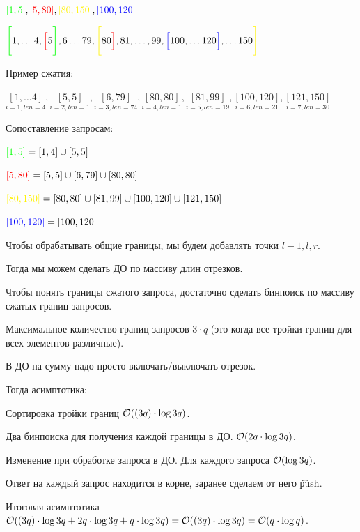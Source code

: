 $\green{[1, 5]}, \red{[5, 80]}, \yellow{[80, 150]}, \blue{[100, 120]}$

$\green{\Bigg[} 1, \ldots 4, \red{\Big[} 5 \green{\Bigg]}, 6 \ldots 79, \yellow{\Bigg[}80 \red{\Big]}, 81, \ldots, 99, \blue{\Big[}100, \ldots 120 \blue{\Big]}, \ldots 150 \yellow{\Bigg]}$
\down

Пример сжатия:

$\underset{i=1, len = 4}{[1, \ldots 4]}, \underset{i=2, len=1}{[5, 5]}, \underset{i=3, len=74}{[6, 79]}, \underset{i=4, len=1}{[80, 80]}, \underset{i=5, len=19}{[81, 99]}, \underset{i=6, len=21}{[100, 120]}, \underset{i=7, len=30}{[121, 150]}$
\down

Сопоставление запросам:

${\color{green}{[1, 5]}} = [1, 4] \cup [5, 5]$

${\color{red}{[5, 80]}} = [5, 5] \cup [6, 79] \cup [80, 80]$

$\yellow{[80, 150]} = [80, 80] \cup [81, 99] \cup [100, 120] \cup [121, 150]$

${\color{blue}{[100, 120]}} = [100, 120]$
\down


Чтобы обрабатывать общие границы, мы будем добавлять точки $l-1,l,r$.

Тогда мы можем сделать ДО по массиву длин отрезков.

Чтобы понять границы сжатого запроса, достаточно сделать бинпоиск по массиву сжатых границ запросов.

Максимальное количество границ запросов $3 \cdot q$ (это когда все тройки границ для всех элементов различные).

В ДО на сумму надо просто включать/выключать отрезок.

Тогда асимптотика:

\up \up
\begin{MyList}[0pt]
	\item Сортировка тройки границ $\mathcal{O}((3q) \cdot \log 3q)$.
	
	\item Два бинпоиска для получения каждой границы в ДО. $\mathcal{O}(2q \cdot \log 3q)$.
	
	\item Изменение при обработке запроса в ДО. Для каждого запроса $\mathcal{O}(\log 3q)$.
	
	\item Ответ на каждый запрос находится в корне, заранее сделаем от него \t{push}.
\end{MyList}

Итоговая асимптотика $\mathcal{O}((3q) \cdot \log 3q + 2q \cdot \log 3q + q \cdot \log 3q) = \mathcal{O}((3q) \cdot \log 3q) = \mathcal{O}(q \cdot \log q)$.


